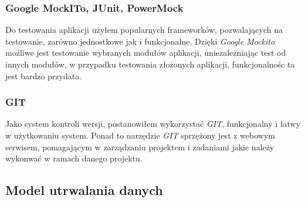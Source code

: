 \documentclass[a4paper, titlepage]{article}
\begin{document}
	\subsubsection{Google MockITo, JUnit, PowerMock}
	Do testowania aplikacji użyłem popularnych frameworków, pozwalających na testowanie, zarówno jednostkowe jak i funkcjonalne. Dzięki \textit{Google Mockito} możliwe jest testowanie wybranych modułów aplikacji, uniezależniając test od innych modułów, w przypadku testowania złożonych aplikacji, funkcjonalnośc ta jest bardzo przydata.
	\subsubsection{GIT}
	Jako system kontroli wersji, postanowiłem wykorzystać \textit{GIT}, funkcjonalny i łatwy w użytkowaniu system. Ponad to narzędzie \textit{GIT} sprzężony jest z webowym serwisem, pomagającym w zarządzaniu projektem i zadaniami jakie należy wykonwać w ramach danego projektu.

\subsection{Model utrwalania danych}
\end{document}
